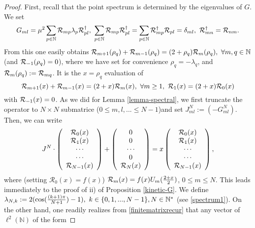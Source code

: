 \documentclass[a4paper,11pt,twoside]{article}
\numberwithin{equation}{section}
\theoremstyle{nonumberplain}
\newtheorem{proof}{Proof}
\newcounter{and}
\begin{document}
\begin{proof}
First, recall that the point spectrum is determined by the eigenvalues of $G$. We set 
\begin{equation}
G_{ml}=\mu^2\sum_{p\in\mathbb{N}}{\cal{R}}_{mp}\lambda_p{\cal{R}}^\dag_{pl},\ \sum_{p\in\mathbb{N}}{\cal{R}}_{mp}{\cal{R}}^\dag_{pl}=\sum_{p\in\mathbb{N}}{\cal{R}}^\dag_{mp}{\cal{R}}_{pl}=\delta_{ml},\ {\cal{R}}^\dag_{mn}={\cal{R}}_{nm}\label{unitarytrans}.
\end{equation}
From this one easily obtains ${\cal{R}}_{m+1}(\rho_q)+{\cal{R}}_{m-1}(\rho_q)=(2+\rho_q){\cal{R}}_{m}(\rho_q),\ \forall m,q\in\mathbb{N}$ (and ${\cal{R}}_{-1}(\rho_q)=0$), where we have set for convenience $\rho_q=-\lambda_q$, and ${\cal{R}}_{m}(\rho_q):={\cal{R}}_{mq}$. It is the $x=\rho_q$ evaluation of
\begin{equation}
{\cal{R}}_{m+1}(x)+{\cal{R}}_{m-1}(x)=(2+x){\cal{R}}_{m}(x),\ \forall m\ge1,\ {\cal{R}}_1(x)=(2+x){\cal{R}}_0(x) \label{chebyshev-gene}
\end{equation}
with ${\cal{R}}_{-1}(x)=0$. As we did for Lemma \ref{lemma-spectral}, we first truncate the operator to $N\times N$ submatrice ($0\le m,l,...\le N-1$)and set $J^N_{ml}:=(-G^N_{ml})$. Then, we can write 
\begin{equation}
J^N\cdot \left(\begin{array}{c}
\mathcal{R}_0(x)\\
\mathcal{R}_1(x)\\ 
\cdots \\
\cdots \\
\mathcal{R}_{N-1}(x)
  \end{array}  \right) + \left(\begin{array}{c}
 0\\
0\\
\cdots \\ 
0 \\
{\cal{R}}_N(x)
  \end{array}  \right)=x\left(\begin{array}{c}
\mathcal{R}_0(x)\\
\mathcal{R}_1(x)\\ 
\cdots \\
\cdots \\
\mathcal{R}_{N-1}(x)
  \end{array}  \right)\label{finitematrixrecur},
\end{equation}
where (setting $\mathcal{R}_0(x)=f(x)$) ${\cal{R}}_m(x)=f(x)U_m({{2+x}\over{2}})$, $0\le m\le N$. This leads immediately to the proof of ii) of Proposition \ref{kinetic-G}. We define $\lambda_{N,k}:=2(\cos({{(k+1)\pi}\over{N+1}})-1), \ k\in\{0,1,...,N-1\}, N\in\mathbb{N}^*$ (see \eqref{spectrum1}). On the other hand, one readily realizes from \eqref{finitematrixrecur} that any vector of $\ell^2(\mathbb{N})$ of the form 

\end{proof}
\end{document}
